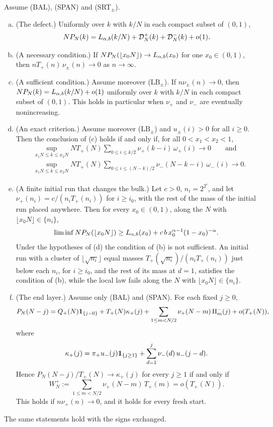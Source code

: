 \begin{introtheorem}\label{thm:initial}
Assume (BAL), (SPAN) and (SRT$_\pm$).
\begin{enumerate}[(a)]
\item (The defect.) Uniformly over $k$ with $k/N$ in each compact subset of $(0,1)$,
\[
 NP_N(k)=L_{\alpha,b}(k/N)+\mathcal D^{+}_N(k)+\mathcal D^{-}_N(k)+o(1).
\]
\item (A necessary condition.) If $NP_N(\lfloor x_0N\rfloor)\to L_{\alpha,b}(x_0)$ for one
$x_0\in(0,1)$, then $nT_\plus(n)\,\nu_\pm(n)\to0$ as $n\to\infty$.
\item (A sufficient condition.) Assume moreover (LB$_\pm$). If $n\nu_\pm(n)\to0$, then
$NP_N(k)=L_{\alpha,b}(k/N)+o(1)$ uniformly over $k$ with $k/N$ in each compact subset of
$(0,1)$. This holds in particular when $\nu_\plus$ and $\nu_\minus$ are eventually
nonincreasing.
\item (An exact criterion.) Assume moreover (LB$_\pm$) and $u_\pm(i)>0$ for all $i\ge0$.
Then the conclusion of (c) holds if and only if, for all $0<x_1<x_2<1$,
\begin{align*}
 &\sup_{x_1N\le k\le x_2N}NT_\plus(N)\sum_{0\le i\le k/2}\nu_\plus(k-i)\,\omega_\plus(i)\to0
 \qquad\text{and}\\
 &\sup_{x_1N\le k\le x_2N}NT_\plus(N)\sum_{0\le i\le(N-k)/2}\nu_\minus(N-k-i)\,\omega_\minus(i)\to0 .
\end{align*}
\item (A finite initial run that changes the bulk.) Let $c>0$, $n_i=2^{2^i}$, and let
$\nu_\plus(n_i)=c/(n_iT_\plus(n_i))$ for $i\ge i_0$, with the rest of the mass of the
initial run placed anywhere. Then for every $x_0\in(0,1)$, along the $N$ with
$\lfloor x_0N\rfloor\in\{n_i\}$,
\[
 \liminf NP_N(\lfloor x_0N\rfloor)\ge L_{\alpha,b}(x_0)+c\,b\,x_0^{\alpha-1}(1-x_0)^{-\alpha}.
\]
Under the hypotheses of (d) the condition of (b) is not sufficient. An initial run with
a cluster of $\lfloor\sqrt{n_i}\rfloor$ equal masses $T_\plus(\sqrt{n_i})/(n_iT_\plus(n_i))$
just below each $n_i$, for $i\ge i_0$, and the rest of its mass at $d=1$, satisfies the
condition of (b), while the local law fails along the
$N$ with $\lfloor x_0N\rfloor\in\{n_i\}$.
\item (The end layer.) Assume only (BAL) and (SPAN). For each fixed $j\ge0$,
\[
 P_N(N-j)=Q_{+}(N)\mathbf{1}_{\{j=0\}}+T_{+}(N)\kappa_{+}(j)
 +\sum_{1\le m<N/2}\nu_{+}(N-m)\,\Pi^{-}_m(j)+o(T_{+}(N)),
\]
where
\begin{equation}\label{eq:kappa-prep}
 \kappa_{+}(j)=\pi_{+} u_{-}(j)\mathbf{1}_{\{j\ge1\}}+\sum_{d=1}^{j}\nu_{-}(d)\,u_{-}(j-d).
\end{equation}
Hence $P_N(N-j)/T_\plus(N)\to\kappa_\plus(j)$ for every $j\ge1$ if and only if
\[
 W^\plus_N:=\sum_{1\le m<N/2}\nu_\plus(N-m)\,T_\plus(m)=o(T_\plus(N)).
\]
This holds if $n\nu_\plus(n)\to0$, and it holds for every fresh start.
\end{enumerate}
The same statements hold with the signs exchanged.
\end{introtheorem}

